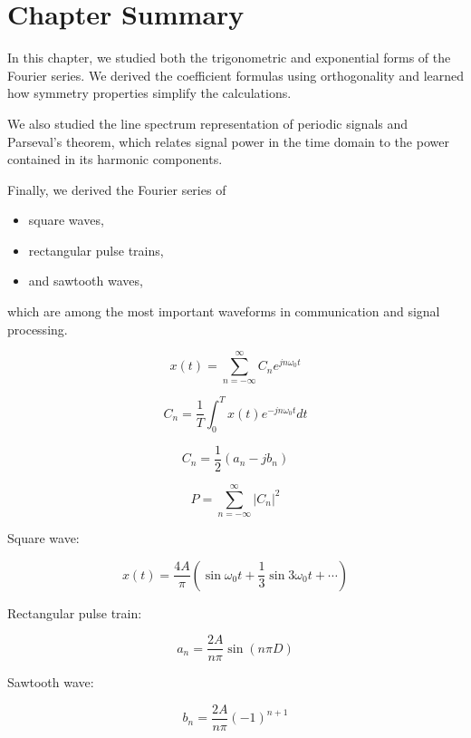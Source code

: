 
\section{Chapter Summary}

In this chapter, we studied both the trigonometric and exponential forms of the
Fourier series. We derived the coefficient formulas using orthogonality and
learned how symmetry properties simplify the calculations.

We also studied the line spectrum representation of periodic signals and
Parseval's theorem, which relates signal power in the time domain to the power
contained in its harmonic components.

Finally, we derived the Fourier series of

\begin{itemize}
\item square waves,
\item rectangular pulse trains,
\item and sawtooth waves,
\end{itemize}

which are among the most important waveforms in communication and signal
processing.


\begin{tcolorbox}[title=One-Minute Revision,colback=blue!5]

\[
x(t)=\sum_{n=-\infty}^{\infty}C_n e^{jn\omega_0 t}
\]

\[
C_n=
\frac{1}{T}
\int_0^T x(t)e^{-jn\omega_0 t}dt
\]

\[
C_n=\frac{1}{2}(a_n-jb_n)
\]

\[
P=\sum_{n=-\infty}^{\infty}|C_n|^2
\]

Square wave:

\[
x(t)=\frac{4A}{\pi}
\left(
\sin\omega_0 t+\frac{1}{3}\sin3\omega_0 t+\cdots
\right)
\]

Rectangular pulse train:

\[
a_n=\frac{2A}{n\pi}\sin(n\pi D)
\]

Sawtooth wave:

\[
b_n=\frac{2A}{n\pi}(-1)^{n+1}
\]

\end{tcolorbox}
